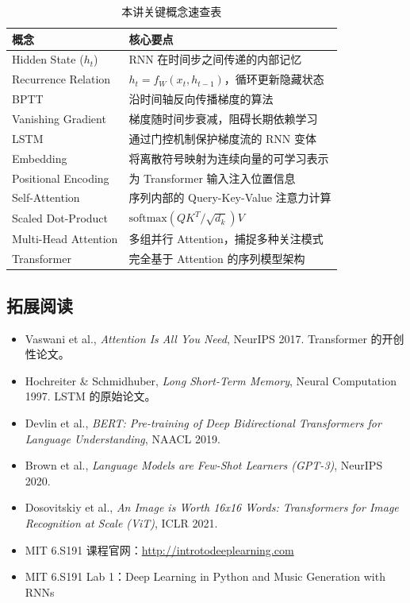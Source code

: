 \begin{table}[H]
\centering
\caption{本讲关键概念速查表}
\begin{tabular}{ll}
\toprule
\textbf{概念} & \textbf{核心要点} \\
\midrule
Hidden State ($h_t$) & RNN 在时间步之间传递的内部记忆 \\
Recurrence Relation & $h_t = f_W(x_t, h_{t-1})$，循环更新隐藏状态 \\
BPTT & 沿时间轴反向传播梯度的算法 \\
Vanishing Gradient & 梯度随时间步衰减，阻碍长期依赖学习 \\
LSTM & 通过门控机制保护梯度流的 RNN 变体 \\
Embedding & 将离散符号映射为连续向量的可学习表示 \\
Positional Encoding & 为 Transformer 输入注入位置信息 \\
Self-Attention & 序列内部的 Query-Key-Value 注意力计算 \\
Scaled Dot-Product & $\text{softmax}(QK^T/\sqrt{d_k})V$ \\
Multi-Head Attention & 多组并行 Attention，捕捉多种关注模式 \\
Transformer & 完全基于 Attention 的序列模型架构 \\
\bottomrule
\end{tabular}
\end{table}

\subsection{拓展阅读}

\begin{itemize}
    \item Vaswani et al., \textit{Attention Is All You Need}, NeurIPS 2017. Transformer 的开创性论文。
    \item Hochreiter \& Schmidhuber, \textit{Long Short-Term Memory}, Neural Computation 1997. LSTM 的原始论文。
    \item Devlin et al., \textit{BERT: Pre-training of Deep Bidirectional Transformers for Language Understanding}, NAACL 2019.
    \item Brown et al., \textit{Language Models are Few-Shot Learners (GPT-3)}, NeurIPS 2020.
    \item Dosovitskiy et al., \textit{An Image is Worth 16x16 Words: Transformers for Image Recognition at Scale (ViT)}, ICLR 2021.
    \item MIT 6.S191 课程官网：\url{http://introtodeeplearning.com}
    \item MIT 6.S191 Lab 1：Deep Learning in Python and Music Generation with RNNs
\end{itemize}



